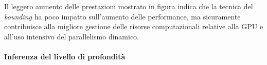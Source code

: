 \begin{figure}[H]
    \centering
    \caption{}
\end{figure}

Il leggero aumento delle prestazioni mostrato in figura indica che la tecnica
del \textit{bounding} ha poco impatto sull'aumento delle performance, ma
sicuramente contribuisce alla migliore gestione delle risorse computazionali
relative alla GPU e all'uso intensivo del parallelismo dinamico.

\paragraph{Inferenza del livello di profondità}


